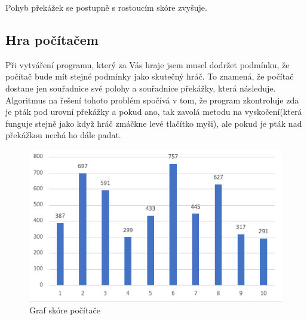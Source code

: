 Pohyb překážek se postupně s rostoucím skóre zvyšuje.

\subsection{Hra počítačem}
Při vytváření programu, který za Vás hraje jsem musel dodržet podmínku, že počítač bude mít stejné podmínky jako skutečný hráč. To znamená, že počítač dostane jen souřadnice své polohy a souřadnice překážky, která následuje. Algoritmus na řešení tohoto problém spočívá v tom, že program zkontroluje zda je pták pod urovní překážky a pokud ano, tak zavolá metodu na vyskočení(která funguje stejně jako když hráč zmáčkne levé tlačítko myši), ale pokud je pták nad překážkou nechá ho dále padat.

\begin{figure}[ht!]
    \centering
    \includegraphics[scale=0.7]{images/graph.png}
    \caption{Graf skóre počítače}
\end{figure}

